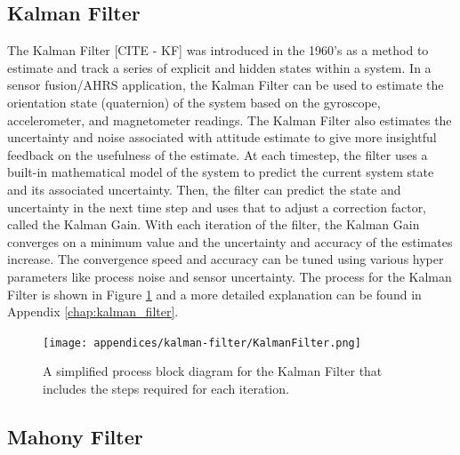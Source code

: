 \subsection{Kalman Filter} \label{ssec:kalman_filter}
The Kalman Filter [CITE - KF] was introduced in the 1960's as a method to estimate and track a series of explicit and hidden states within a system.
In a sensor fusion/AHRS application, the Kalman Filter can be used to estimate the orientation state (quaternion) of the system based on the gyroscope, accelerometer, and magnetometer readings.
The Kalman Filter also estimates the uncertainty and noise associated with attitude estimate to give more insightful feedback on the usefulness of the estimate.
At each timestep, the filter uses a built-in mathematical model of the system to predict the current system state and its associated uncertainty.
Then, the filter can predict the state and uncertainty in the next time step and uses that to adjust a correction factor, called the Kalman Gain.
With each iteration of the filter, the Kalman Gain converges on a minimum value and the uncertainty and accuracy of the estimates increase.
The convergence speed and accuracy can be tuned using various hyper parameters like process noise and sensor uncertainty.
The process for the Kalman Filter is shown in Figure \ref{fig:bkg_kalman_filter_process} and a more detailed explanation can be found in Appendix \ref{chap:kalman_filter}.

\begin{figure}
    \centering
    \label{fig:bkg_kalman_filter_process}
    \texttt{[image: appendices/kalman-filter/KalmanFilter.png]}
    \caption[Kalman Filter Process]{A simplified process block diagram for the Kalman Filter that includes the steps required for each iteration.}
\end{figure}

\subsection{Mahony Filter} \label{ssec:mahony_filter}

